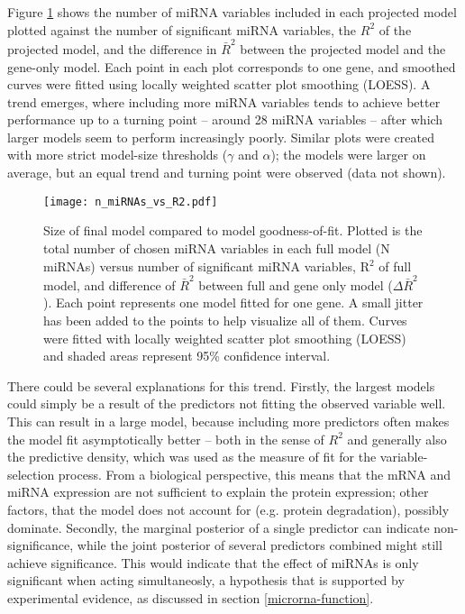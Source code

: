Figure \ref{n-miRNAs-vs-R2} shows the number of miRNA variables included in
each projected model plotted against the number of significant miRNA
variables, the $R^2$ of the projected model, and the difference in $\bar{R}^2$
between the projected model and the gene-only model. Each point in each plot
corresponds to one gene, and smoothed curves were fitted using locally
weighted scatter plot smoothing (LOESS). A trend emerges, where including more
miRNA variables tends to achieve better performance up to a turning point --
around 28 miRNA variables -- after which larger models seem to perform
increasingly poorly. Similar plots were created with more strict model-size
thresholds ($\gamma$ and $\alpha$); the models were larger on
average, but an equal trend and turning point were observed (data not shown).

\begin{figure}[htb]
  \centering
  \texttt{[image: n\_miRNAs\_vs\_R2.pdf]}
  \caption{Size of final model compared to model goodness-of-fit. Plotted is the total number of chosen miRNA variables in each full model (N miRNAs) versus number of significant miRNA variables, R$^2$ of full model, and difference of $\bar{R}^2$ between full and gene only model ($\Delta\bar{R}^2$). Each point represents one model fitted for one gene. A small jitter has been added to the points to help visualize all of them. Curves were fitted with locally weighted scatter plot smoothing (LOESS) and shaded areas represent 95\% confidence interval. \label{n-miRNAs-vs-R2}}
\end{figure}

There could be several explanations for this trend. Firstly, the largest
models could simply be a result of the predictors not fitting the observed
variable well. This can result in a large model, because including more
predictors often makes the model fit asymptotically better -- both in the
sense of $R^2$ and generally also the predictive density, which was used as
the measure of fit for the variable-selection process. From a biological
perspective, this means that the mRNA and miRNA expression are not sufficient
to explain the protein expression; other factors, that the model does not
account for (e.g. protein degradation), possibly dominate.
Secondly, the marginal posterior of a single predictor can indicate
non-significance, while the joint posterior of several predictors combined
might still achieve significance. This would indicate that the effect of
miRNAs is only significant when acting simultaneosly, a hypothesis that is
supported by experimental evidence, as discussed in section
\ref{microrna-function}.

